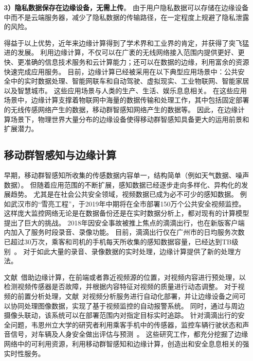 \textbf{3）隐私数据保存在边缘设备，无需上传}。
由于用户隐私数据可以存储在边缘设备中而不是云端服务器，减少了隐私数据的传输路径，在一定程度上规避了隐私泄露的风险。

得益于以上优势，近年来边缘计算得到了学术界和工业界的肯定，并获得了突飞猛进的发展。
利用边缘计算，不仅可以在广袤的无线网络接入范围内提供更好、更快、更准确的信息技术服务和云计算能力；还可以在数据的边缘，利用富余的资源快速完成应用服务。
目前，边缘计算已经被采用在以下典型应用场景中：公共安全中的实时数据处理、智能网联车和自动驾驶、虚拟现实、工业物联网、智能家居以及智慧城市。
这些应用场景与人类的生产、生活、娱乐息息相关。
在这些应用场景中，边缘计算支撑着物联网中海量的数据传输和处理工作，其中包括固定部署的无线传感网络产生的数据，移动群智感知网络产生的数据等。
因此，在边缘计算场景下，物理世界大量分布的边缘设备使得移动群智感知具备更大的运用前景和扩展潜力。





\subsection{移动群智感知与边缘计算}



早期，移动群智感知所收集的传感数据内容单一，结构简单（例如天气数据、噪声数据）。
但随着应用范围的不断扩展，感知数据已经逐步走向多样化、异构化的发展趋势。
尤其是在社会公共安全领域，视频数据已成为必不可少的感知数据。
例如武汉市的“雪亮工程”，于2019年中期将在全市部署150万个公共安全视频监控。
这样庞大监控网络无论是在数据备份还是在实时数据分析上，都对现有的计算模型提出了巨大的挑战。
2018年因安全事故被推上焦点的滴滴出行，也在新版客户端内加入了服务时段录音、录像功能。
目前，滴滴出行仅在广州市的日均服务次数已超过30万次，乘客和司机的手机每天所收集的感知数据容量，已经达到TB级别~\cite{DBLP:conf/aaai/Yao0KTJLGYL18}。
对于如此大量的录音、录像数据的实时处理，边缘计算提供了新的处理方法。

文献~借助边缘计算，在前端或者靠近视频源的位置，对视频内容进行预处理，以检测视频传感器是否故障，并根据内容特征对视频的质量进行动态调整。
对于视频的前置分析处理，文献~对视频分析服务进行自动化部署，并让边缘设备之间可以协同处理图像数据，实现了基于视频监控的自动报警系统。
同时，通过与周边摄像头联动，该系统可以在部署范围内对指定目标实时追踪。
针对滴滴出行的安全问题，韦恩州立大学的研究者利用乘客手机中的传感器，监控车辆行驶状态和声音信号，对车辆及人身安全做出评估与预测~\cite{DBLP:conf/edge/LiuZQS18}。
这些研究工作，都充分挖掘了边缘网络中的可利用资源，利用移动群智感知和边缘计算，创造出和安全息息相关的强实时性服务。

